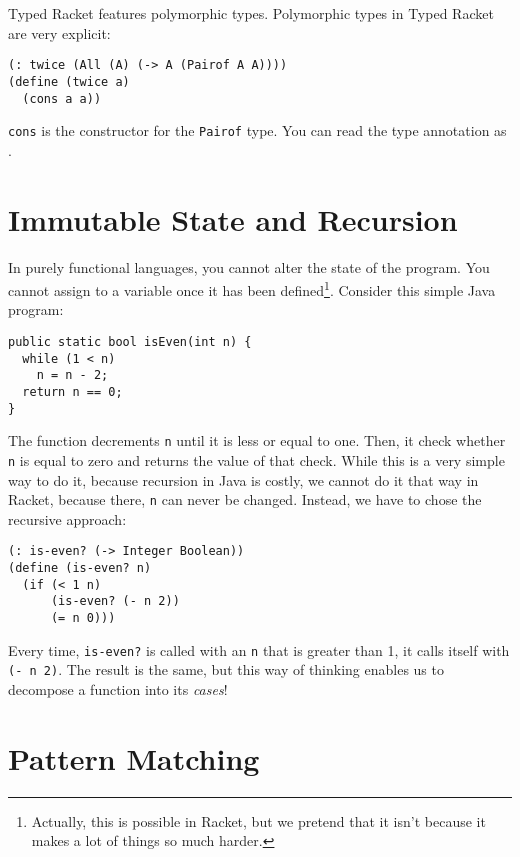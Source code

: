 \documentclass{article}
\begin{document}
Typed Racket features polymorphic types. Polymorphic types in Typed Racket are very explicit:

\begin{lstlisting}
(: twice (All (A) (-> A (Pairof A A))))
(define (twice a)
  (cons a a))
\end{lstlisting}

\lstinline{cons} is the constructor for the \lstinline{Pairof} type. You can read the type annotation as .

\section{Immutable State and Recursion}

In purely functional languages, you cannot alter the state of the program. You cannot assign to a variable once it has been defined\footnote{Actually, this is possible in Racket, but we pretend that it isn't because it makes a lot of things so much harder.}. Consider this simple Java program:

\begin{lstlisting}[style=Java]
public static bool isEven(int n) {
  while (1 < n)
    n = n - 2;
  return n == 0;
}
\end{lstlisting}

The function decrements \lstinline[style=Java]{n} until it is less or equal to one. Then, it check whether \lstinline[style=Java]{n} is equal to zero and returns the value of that check. While this is a very simple way to do it, because recursion in Java is costly, we cannot do it that way in Racket, because there, \lstinline{n} can never be changed. Instead, we have to chose the recursive approach:

\begin{lstlisting}
(: is-even? (-> Integer Boolean))
(define (is-even? n)
  (if (< 1 n)
      (is-even? (- n 2))
      (= n 0)))
\end{lstlisting}

Every time, \lstinline{is-even?} is called with an \lstinline{n} that is greater than 1, it calls itself with \lstinline{(- n 2)}. The result is the same, but this way of thinking enables us to decompose a function into its \emph{cases}!

\section{Pattern Matching}
\end{document}
